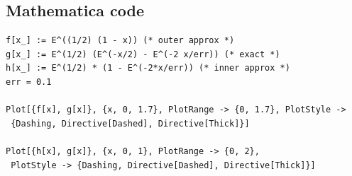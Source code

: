 \documentclass[12pt]{article}
\begin{document}
\subsection{Mathematica code}
\begin{verbatim}
f[x_] := E^((1/2) (1 - x)) (* outer approx *)
g[x_] := E^(1/2) (E^(-x/2) - E^(-2 x/err)) (* exact *)
h[x_] := E^(1/2) * (1 - E^(-2*x/err)) (* inner approx *)
err = 0.1

Plot[{f[x], g[x]}, {x, 0, 1.7}, PlotRange -> {0, 1.7}, PlotStyle ->
 {Dashing, Directive[Dashed], Directive[Thick]}]

Plot[{h[x], g[x]}, {x, 0, 1}, PlotRange -> {0, 2}, 
 PlotStyle -> {Dashing, Directive[Dashed], Directive[Thick]}]
\end{verbatim}


\end{document}
